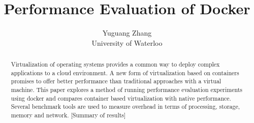 \documentclass[11pt]{article}
\begin{document}
	
	\thispagestyle{empty}
	
	\title{Performance Evaluation of Docker}
	
	\author{Yuguang Zhang \\ University of Waterloo}
	
	\maketitle
	

\begin{abstract}
Virtualization of operating systems provides a common way to deploy complex
applications to a cloud environment. A new form of virtualization based on containers
promises to offer better performance than traditional approaches with a virtual machine.
This paper explores a method of running performance evaluation experiments using
docker and compares container based virtualization with native performance. Several
benchmark tools are used to measure overhead in terms of processing, storage,
memory and network. [Summary of results]
\end{abstract}
\end{document}
